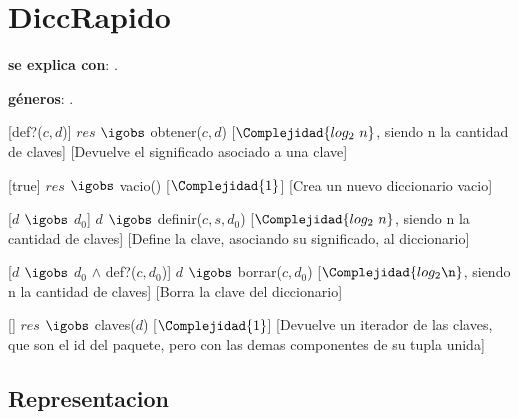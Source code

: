 \section{DiccRapido}

\begin{Interfaz}
  
  \textbf{se explica con}: .

  \textbf{géneros}: .


  [def?($c, d$)]
  {$res$ $\igobs$ obtener($c, d$)}
  [$\Complejidad{log_2\ n}$, siendo n la cantidad de claves]
  [Devuelve el significado asociado a una clave]
  
  [true]
  {$res$ $\igobs$ vacio()}
  [$\Complejidad{1}$]
  [Crea un nuevo diccionario vacio]  
  
  [$d$ $\igobs$ $d_0$]
  {$d$ $\igobs$ definir($c, s, d_0$)}
  [$\Complejidad{log_2\ n}$, siendo n la cantidad de claves]
  [Define la clave, asociando su significado, al diccionario]
  
  [$d$ $\igobs$ $d_0$ $\wedge$ def?($c, d_0$)]
  {$d$ $\igobs$ borrar($c, d_0$)}
  [$\Complejidad{log_2 \n}$, siendo n la cantidad de claves]
  [Borra la clave del diccionario]

  []
  {$res$ $\igobs$ claves($d$)}
  [$\Complejidad{1}$]
  [Devuelve un iterador de las claves, que son el id del paquete, pero con las demas componentes de su tupla unida]  
  
\end{Interfaz}

\subsection{Representacion}



